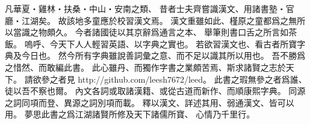 凡華夏・雞林・扶桑・中山・安南之類、
昔者士夫齊嘗識漢文、用諸書塾・官廳・江湖矣。
故該地多童應於校習漢文焉。
漢文重雖如此、槿原之童都爲之無所以當識之物頗久。
今者諸國徒以其京辭爲通言之本、
舉筆則書口舌之所言如茶飯。
嗚呼、今天下人人輕習英語、以字典之實也。
若欲習漢文也、看古者所寶字典及今日也。
然今所有字典雖說善詞彙之意、而不足以識其所以用也。
吾不勝爲之惜然、而敢編此書。
此心雖丹、而獨作字書之業頗苦焉、斯求諸賢之志於天下。
請欲參之者見 http://github.com/leesh7672/leed。
此書之瑕無參之者爲誰、徒以吾不察也爾。
內文各詞或取諸漢籍、或從古道而新作、而順康熙字典。
同源之詞同項而登、異源之詞別項而載。
釋以漢文、詳述其用、弱通漢文、皆可以用。
夢思此書之爲江湖諸賢所修及天下諸儒所寶、
心情乃千里行。
